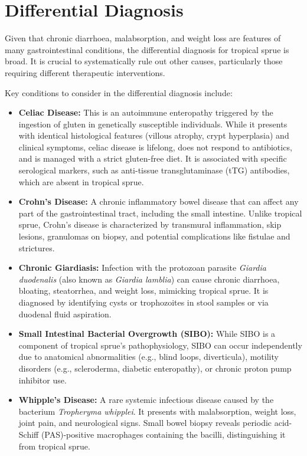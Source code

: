 \section*{Differential Diagnosis}
Given that chronic diarrhoea, malabsorption, and weight loss are features of many gastrointestinal conditions, the differential diagnosis for tropical sprue is broad. It is crucial to systematically rule out other causes, particularly those requiring different therapeutic interventions.

Key conditions to consider in the differential diagnosis include:
\begin{itemize}
    \item \textbf{Celiac Disease:} This is an autoimmune enteropathy triggered by the ingestion of gluten in genetically susceptible individuals. While it presents with identical histological features (villous atrophy, crypt hyperplasia) and clinical symptoms, celiac disease is lifelong, does not respond to antibiotics, and is managed with a strict gluten-free diet. It is associated with specific serological markers, such as anti-tissue transglutaminase (tTG) antibodies, which are absent in tropical sprue.
    \item \textbf{Crohn's Disease:} A chronic inflammatory bowel disease that can affect any part of the gastrointestinal tract, including the small intestine. Unlike tropical sprue, Crohn's disease is characterized by transmural inflammation, skip lesions, granulomas on biopsy, and potential complications like fistulae and strictures.
    \item \textbf{Chronic Giardiasis:} Infection with the protozoan parasite \textit{Giardia duodenalis} (also known as \textit{Giardia lamblia}) can cause chronic diarrhoea, bloating, steatorrhea, and weight loss, mimicking tropical sprue. It is diagnosed by identifying cysts or trophozoites in stool samples or via duodenal fluid aspiration.
    \item \textbf{Small Intestinal Bacterial Overgrowth (SIBO):} While SIBO is a component of tropical sprue's pathophysiology, SIBO can occur independently due to anatomical abnormalities (e.g., blind loops, diverticula), motility disorders (e.g., scleroderma, diabetic enteropathy), or chronic proton pump inhibitor use.
    \item \textbf{Whipple's Disease:} A rare systemic infectious disease caused by the bacterium \textit{Tropheryma whipplei}. It presents with malabsorption, weight loss, joint pain, and neurological signs. Small bowel biopsy reveals periodic acid-Schiff (PAS)-positive macrophages containing the bacilli, distinguishing it from tropical sprue.

\end{itemize}
